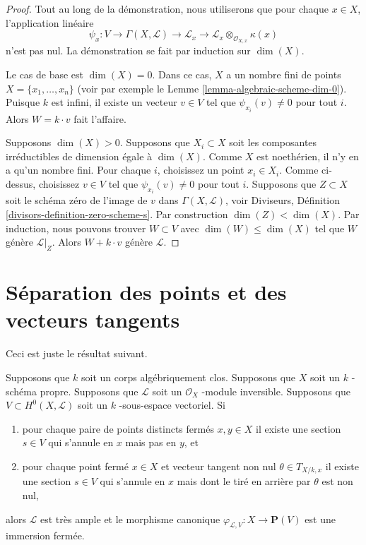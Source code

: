 \begin{proof}
Tout au long de la démonstration, nous utiliserons
que pour chaque $x \in X$, l'application linéaire
$$
\psi_x : V \to \Gamma(X, \mathcal{L}) \to \mathcal{L}_x \to
\mathcal{L}_x \otimes_{\mathcal{O}_{X, x}} \kappa(x)
$$
n'est pas nul. La démonstration se fait par induction sur $\dim(X)$.

\medskip\noindent
Le cas de base est $\dim(X) = 0$. Dans ce cas, $X$ a un
nombre fini de points $X = \{x_1, \ldots, x_n\}$ (voir par
exemple le Lemme \ref{lemma-algebraic-scheme-dim-0}). Puisque
$k$ est infini, il existe un vecteur $v \in V$ tel que
$\psi_{x_i}(v) \not = 0$ pour tout $i$. Alors $W = k\cdot v$ fait l’affaire.

\medskip\noindent
Supposons $\dim(X) > 0$. Supposons que $X_i \subset X$ soit les
composantes irréductibles de dimension égale à $\dim(X)$. Comme $X$
est noethérien, il n’y en a qu’un nombre fini. Pour chaque $i$,
choisissez un point $x_i \in X_i$. Comme ci-dessus, choisissez $v
\in V$ tel que $\psi_{x_i}(v) \not = 0$ pour tout $i$. Supposons que
$Z \subset X$ soit le schéma zéro de l’image de $v$ dans $\Gamma(X,
\mathcal{L})$, voir Diviseurs, Définition
\ref{divisors-definition-zero-scheme-s}. Par construction $\dim(Z) < \dim(X)$.
Par induction, nous pouvons trouver $W \subset V$ avec $\dim(W) \leq \dim(X)$
tel que $W$ génère $\mathcal{L}|_Z$. Alors $W + k\cdot v$ génère $\mathcal{L}$.
\end{proof}






\section{Séparation des points et des vecteurs tangents}
\label{section-separating-points-tangent-vectors}

\noindent
Ceci est juste le résultat suivant.

\begin{lemma}
\label{lemma-separate-points-tangent-vectors}
Supposons que $k$ soit un corps algébriquement clos. Supposons
que $X$ soit un $k$ -schéma propre. Supposons que $\mathcal{L}$
soit un $\mathcal{O}_X$ -module inversible. Supposons que $V
\subset H^0(X, \mathcal{L})$ soit un $k$ -sous-espace vectoriel. Si
\begin{enumerate}
\item pour chaque paire de points distincts fermés $x, y \in X$ il
existe une section $s \in V$ qui s'annule en $x$ mais pas en $y$,
et \item pour chaque point fermé $x \in X$ et vecteur tangent non
nul $\theta \in T_{X/k, x}$ il existe une section $s \in V$ qui
s'annule en $x$ mais dont le tiré en arrière par $\theta$ est non nul,
\end{enumerate}
alors $\mathcal{L}$ est très ample et le
morphisme canonique $\varphi_{\mathcal{L}, V} :
X \to \mathbf{P}(V)$ est une immersion fermée.
\end{lemma}

